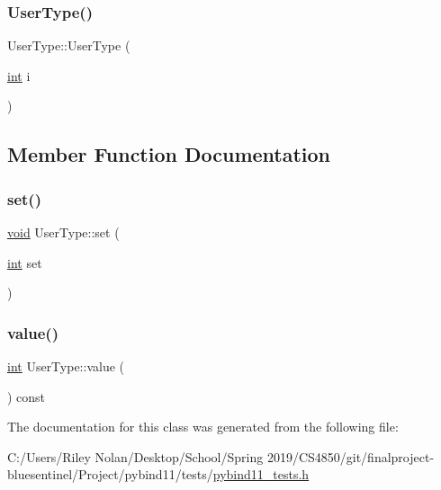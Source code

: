 \mbox{\label{class_user_type_aa61d8a4462ac6fe39a0cfc85ee93b19a}} 
\subsubsection{\texorpdfstring{UserType()}{UserType()}\hspace{0.1cm}{\footnotesize\ttfamily [2/2]}}
{\footnotesize\ttfamily User\+Type\+::\+User\+Type (\begin{DoxyParamCaption}\item[{\mbox{\hyperlink{warnings_8h_a74f207b5aa4ba51c3a2ad59b219a423b}{int}}}]{i }\end{DoxyParamCaption})\hspace{0.3cm}{\ttfamily [inline]}}



\subsection{Member Function Documentation}
\mbox{\label{class_user_type_a38dbad5273d94b067e9fe781d7e1f240}} 
\subsubsection{\texorpdfstring{set()}{set()}}
{\footnotesize\ttfamily \mbox{\hyperlink{_s_d_l__opengles2__gl2ext_8h_ae5d8fa23ad07c48bb609509eae494c95}{void}} User\+Type\+::set (\begin{DoxyParamCaption}\item[{\mbox{\hyperlink{warnings_8h_a74f207b5aa4ba51c3a2ad59b219a423b}{int}}}]{set }\end{DoxyParamCaption})\hspace{0.3cm}{\ttfamily [inline]}}

\mbox{\label{class_user_type_a75d36252b67fa6a4947a8bdefa6e19b3}} 
\subsubsection{\texorpdfstring{value()}{value()}}
{\footnotesize\ttfamily \mbox{\hyperlink{warnings_8h_a74f207b5aa4ba51c3a2ad59b219a423b}{int}} User\+Type\+::value (\begin{DoxyParamCaption}{ }\end{DoxyParamCaption}) const\hspace{0.3cm}{\ttfamily [inline]}}



The documentation for this class was generated from the following file\+:\begin{DoxyCompactItemize}
\item 
C\+:/\+Users/\+Riley Nolan/\+Desktop/\+School/\+Spring 2019/\+C\+S4850/git/finalproject-\/bluesentinel/\+Project/pybind11/tests/\mbox{\hyperlink{pybind11__tests_8h}{pybind11\+\_\+tests.\+h}}\end{DoxyCompactItemize}
